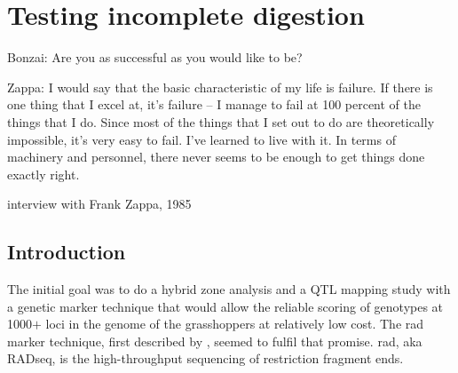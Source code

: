 \documentclass[a4paper,12pt,times,print,index, custombib]{PhDThesisPSnPDF}\usepackage[]{graphicx}\usepackage[]{color}
\begin{document}
\tableofcontents

\listoffigures

\printglossaries

\chapter{Testing incomplete digestion}

\ifpdf
    \graphicspath{
    {./Figs/Raster/}
    {./Figs/PDF/}
    {./Figs/}
    }
\else
    \graphicspath{ 
    {./Figs/Vector/}
    {./Figs/}
    }
\fi



%

\epigraph{
Bonzai: Are you as successful as you would like to be?

Zappa: I would say that the basic characteristic of my life is failure. 
If there is one thing that I excel at, it's failure -- I manage to fail at 100 percent of the things that I do. 
Since most of the things that I set out to do are theoretically impossible, it's very easy to fail. 
I've learned to live with it. 
In terms of machinery and personnel, there never seems to be enough to get things done exactly right.
}{interview with Frank Zappa, 1985}


\section{Introduction}
The initial goal was to do a hybrid zone analysis and a QTL mapping study with a genetic marker technique that would allow the reliable scoring of genotypes at 1000$+$ loci in the genome of the grasshoppers at relatively low cost. The \gls{rad} marker technique, first described by \cite{Baird2008}, seemed to fulfil that promise.  \gls{rad}, aka RADseq, is the high-throughput sequencing of restriction fragment ends. \\
\end{document}
